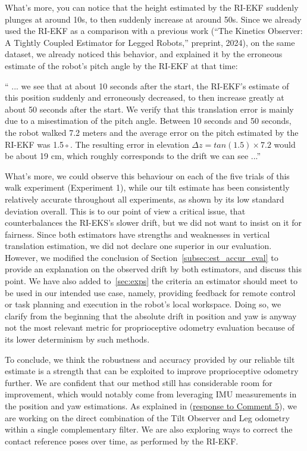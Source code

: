 What's more, you can notice that the height estimated by the RI-EKF suddenly plunges at around 10s, to then suddenly increase at around 50s. Since we already used the RI-EKF as a comparison with a previous work (“The Kinetics Observer: A Tightly Coupled Estimator for Legged Robots,” preprint, 2024), on the same dataset, we already noticed this behavior, and explained it by the erroneous estimate of the robot's pitch angle by the RI-EKF at that time:

\begin{quotepaper}
`` ... we see that at about 10 seconds after
the start, the RI-EKF’s estimate of this position suddenly and
erroneously decreased, to then increase greatly at about 50
seconds after the start. We verify that this translation error is
mainly due to a misestimation of the pitch angle. Between
10 seconds and 50 seconds, the robot walked 7.2 meters and
the average error on the pitch estimated by the RI-EKF was
1.5◦. The resulting error in elevation $\Delta z = tan(1.5) \times 7.2$
would be about 19 cm, which roughly corresponds to the drift we can see ...''
\end{quotepaper}

What's more, we could observe this behaviour on each of the five trials of this walk experiment (Experiment 1), while our tilt estimate has been consistently relatively accurate throughout all experiments, as shown by its low standard deviation overall.
This is to our point of view a critical issue, that counterbalances the RI-EKS's slower drift, but we did not want to insist on it for fairness. 
Since both estimators have strengths and weaknesses in vertical translation estimation, we did not declare one superior in our evaluation. However, we modified the conclusion of Section~\ref{subsec:est_accur_eval} to provide an explanation on the observed drift by both estimators, and discuss this point. We have also added to~\ref{sec:exps} the criteria an estimator should meet to be used in our intended use case, namely, providing feedback for remote control or task planning and execution in the robot's local workspace. Doing so, we clarify from the beginning that the absolute drift in position and yaw is anyway not the most relevant metric for proprioceptive odometry evaluation because of its lower determinism by such methods. 



To conclude, we think the robustness and accuracy provided by our reliable tilt estimate is a strength that can be exploited to improve proprioceptive odometry further. We are confident that our method still has considerable room for improvement, which would notably come from leveraging IMU measurements in the position and yaw estimations. As explained in (\hyperlink{CommentSe3Fusion}{response to Comment 5}), we are working on the direct combination of the Tilt Observer and Leg odometry within a single complementary filter. We are also exploring ways to correct the contact reference poses over time, as performed by the RI-EKF.



